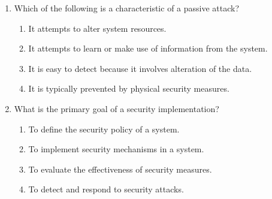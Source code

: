 \documentclass{article}
\begin{document}
\begin{enumerate}
    \item Which of the following is a characteristic of a passive attack?
    \begin{enumerate}
        \item It attempts to alter system resources.
        \item It attempts to learn or make use of information from the system.
        \item It is easy to detect because it involves alteration of the data.
        \item It is typically prevented by physical security measures.
    \end{enumerate}
    
    \item What is the primary goal of a security implementation?
    \begin{enumerate}
        \item To define the security policy of a system.
        \item To implement security mechanisms in a system.
        \item To evaluate the effectiveness of security measures.
        \item To detect and respond to security attacks.
    \end{enumerate}
\end{enumerate}
\newpage
\end{document}
